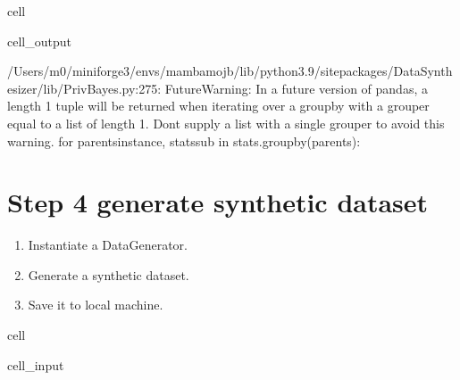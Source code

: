 \documentclass[letterpaper,10pt,english]{jupyterBook}
\begin{document}
\begin{sphinxuseclass}{cell}
\begin{sphinxVerbatimOutput}
\begin{sphinxuseclass}{cell_output}
\begin{sphinxVerbatim}[commandchars=\\\{\}]
/Users/m0/miniforge3/envs/mambamojb/lib/python3.9/site\PYGZhy{}packages/DataSynthesizer/lib/PrivBayes.py:275: FutureWarning: In a future version of pandas, a length 1 tuple will be returned when iterating over a groupby with a grouper equal to a list of length 1. Don\PYGZsq{}t supply a list with a single grouper to avoid this warning.
  for parents\PYGZus{}instance, stats\PYGZus{}sub in stats.groupby(parents):
\end{sphinxVerbatim}

\end{sphinxuseclass}\end{sphinxVerbatimOutput}

\end{sphinxuseclass}

\section{Step 4 generate synthetic dataset}
\label{\detokenize{src/test/SynthNAV0:id11}}\begin{enumerate}
%
\item {} 
\sphinxAtStartPar
Instantiate a DataGenerator.

\item {} 
\sphinxAtStartPar
Generate a synthetic dataset.

\item {} 
\sphinxAtStartPar
Save it to local machine.

\end{enumerate}

\begin{sphinxuseclass}{cell}\begin{sphinxVerbatimInput}

\begin{sphinxuseclass}{cell_input}
\begin{sphinxVerbatim}[commandchars=\\\{\}]
  
 
\end{sphinxVerbatim}

\end{sphinxuseclass}\end{sphinxVerbatimInput}

\end{sphinxuseclass}
\end{document}
